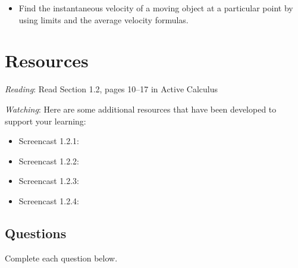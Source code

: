 \documentclass{ximera}
\begin{document}
\begin{itemize}
	\item Find the instantaneous velocity of a moving object at a particular point by using limits and the average velocity formulas.
\end{itemize}

\section{Resources}

\noindent
\emph{Reading}: Read Section 1.2, pages 10--17 in Active Calculus 

\noindent
\emph{Watching}: Here are some additional resources that have been developed to support your learning: 

\begin{itemize}
	\item Screencast 1.2.1:  
	\item Screencast 1.2.2: 
	\item Screencast 1.2.3: 
	\item Screencast 1.2.4: 
\end{itemize}

\subsection*{Questions}

\noindent Complete each question below.  
\end{document}

